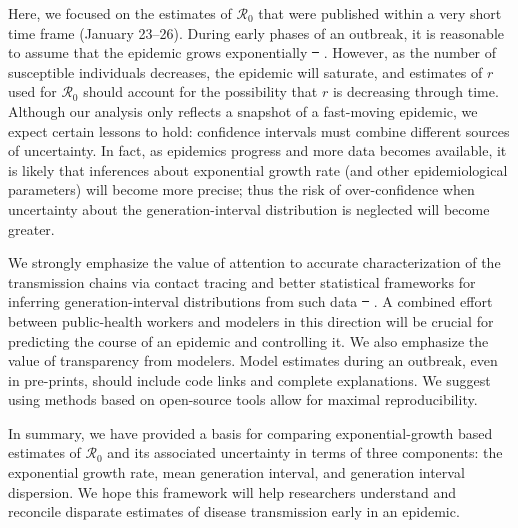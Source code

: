 \documentclass[12pt]{article}
\newcommand{\Ro}{\ensuremath{{\mathcal R}_{0}}\xspace}
\providecommand{\DIFaddtex}[1]{{\protect\color{blue}\uwave{#1}}} %
\providecommand{\DIFdeltex}[1]{{\protect\color{red}\sout{#1}}}                      %
\providecommand{\DIFaddbegin}{} %
\providecommand{\DIFaddend}{} %
\providecommand{\DIFdelbegin}{} %
\providecommand{\DIFdelend}{} %
\providecommand{\DIFadd}[1]{\texorpdfstring{\DIFaddtex{#1}}{#1}} %
\providecommand{\DIFdel}[1]{\texorpdfstring{\DIFdeltex{#1}}{}} %
\newcommand{\DIFscaledelfig}{0.5}
\newlength{\DIFdelgraphicswidth} %
\newlength{\DIFdelgraphicsheight} %
\newcommand{\DIFaddincludegraphics}[2][]{{\color{blue}\fbox{\DIFOincludegraphics[#1]{#2}}}} %
\newcommand{\DIFdelincludegraphics}[2][]{%
\sbox{\DIFdelgraphicsbox}{\DIFOincludegraphics[#1]{#2}}%
\settoboxwidth{\DIFdelgraphicswidth}{\DIFdelgraphicsbox} %
\settoboxtotalheight{\DIFdelgraphicsheight}{\DIFdelgraphicsbox} %
\scalebox{\DIFscaledelfig}{%
\parbox[b]{\DIFdelgraphicswidth}{\usebox{\DIFdelgraphicsbox}\\[-\baselineskip] \rule{\DIFdelgraphicswidth}{0em}}\llap{\resizebox{\DIFdelgraphicswidth}{\DIFdelgraphicsheight}{%
\setlength{\unitlength}{\DIFdelgraphicswidth}%
\begin{picture}(1,1)%
\thicklines\linethickness{2pt} %
{\color[rgb]{1,0,0}\put(0,0){\framebox(1,1){}}}%
{\color[rgb]{1,0,0}\put(0,0){\line( 1,1){1}}}%
{\color[rgb]{1,0,0}\put(0,1){\line(1,-1){1}}}%
\end{picture}%
}\hspace*{3pt}}} %
} %
\DeclareRobustCommand{\DIFaddbegin}{\DIFOaddbegin \let\includegraphics\DIFaddincludegraphics} %
\DeclareRobustCommand{\DIFaddend}{\DIFOaddend \let\includegraphics\DIFOincludegraphics} %
\DeclareRobustCommand{\DIFdelbegin}{\DIFOdelbegin \let\includegraphics\DIFdelincludegraphics} %
\DeclareRobustCommand{\DIFdelend}{\DIFOaddend \let\includegraphics\DIFOincludegraphics} %
\begin{document}
Here, we focused on the estimates of \Ro that were published within a very short time frame (January 23--26).
During early phases of an outbreak, it is reasonable to assume that the epidemic grows exponentially \DIFdelbegin \DIFdel{\mbox{%
\citep{anderson1991infectious}}\hspace{0pt}%
}\DIFdelend \DIFaddbegin \DIFadd{\mbox{%
\cite{anderson1991infectious}}\hspace{0pt}%
}\DIFaddend . However, as the number of susceptible individuals decreases, the epidemic will saturate, and estimates of $r$ used for \Ro should account for the possibility that $r$ is decreasing through time.
Although our analysis only reflects a snapshot of a fast-moving epidemic, we expect certain lessons to hold: confidence intervals must combine different sources of uncertainty. 
In fact, as epidemics progress and more data becomes available, it is likely that inferences about exponential growth rate (and other epidemiological parameters) will become more precise; thus the risk of over-confidence when uncertainty about the generation-interval distribution is neglected will become greater.

We strongly emphasize the value of attention to accurate characterization of the transmission chains via contact tracing and better statistical frameworks for inferring generation-interval distributions from such data \DIFdelbegin \DIFdel{\mbox{%
\citep{britton2019estimation}}\hspace{0pt}%
}\DIFdelend \DIFaddbegin \DIFadd{\mbox{%
\cite{britton2019estimation}}\hspace{0pt}%
}\DIFaddend .
A combined effort between public-health workers and modelers in this direction will be crucial for predicting the course of an epidemic and controlling it.
We also emphasize the value of transparency from modelers.
Model estimates during an outbreak, even in pre-prints, should include code links and complete explanations.
We suggest using methods based on open-source tools allow for maximal reproducibility.

In summary, we have provided a basis for comparing exponential-growth based estimates of \Ro and its associated uncertainty in terms of three components: the exponential growth rate, mean generation interval, and generation interval dispersion. 
We hope this framework will help researchers understand and reconcile disparate estimates of disease transmission early in an epidemic.
\end{document}
